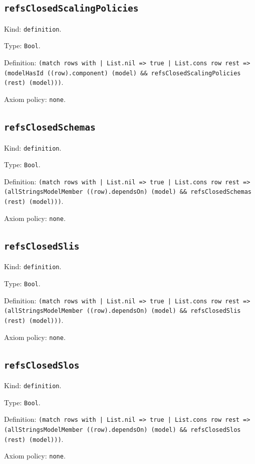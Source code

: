 \documentclass[11pt]{article}
\begin{document}
\subsection*{\texttt{refsClosedScalingPolicies}}
\noindent Kind: \texttt{definition}.\par
\noindent Type: \texttt{Bool}.\par
\noindent Definition: \texttt{(match rows with | List.nil => true | List.cons row rest => (modelHasId ((row).component) (model) \&\& refsClosedScalingPolicies (rest) (model)))}.\par
\noindent Axiom policy: \texttt{none}.\par
\subsection*{\texttt{refsClosedSchemas}}
\noindent Kind: \texttt{definition}.\par
\noindent Type: \texttt{Bool}.\par
\noindent Definition: \texttt{(match rows with | List.nil => true | List.cons row rest => (allStringsModelMember ((row).dependsOn) (model) \&\& refsClosedSchemas (rest) (model)))}.\par
\noindent Axiom policy: \texttt{none}.\par
\subsection*{\texttt{refsClosedSlis}}
\noindent Kind: \texttt{definition}.\par
\noindent Type: \texttt{Bool}.\par
\noindent Definition: \texttt{(match rows with | List.nil => true | List.cons row rest => (allStringsModelMember ((row).dependsOn) (model) \&\& refsClosedSlis (rest) (model)))}.\par
\noindent Axiom policy: \texttt{none}.\par
\subsection*{\texttt{refsClosedSlos}}
\noindent Kind: \texttt{definition}.\par
\noindent Type: \texttt{Bool}.\par
\noindent Definition: \texttt{(match rows with | List.nil => true | List.cons row rest => (allStringsModelMember ((row).dependsOn) (model) \&\& refsClosedSlos (rest) (model)))}.\par
\noindent Axiom policy: \texttt{none}.\par
\end{document}
